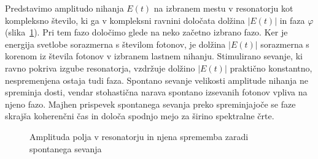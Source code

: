 Predstavimo amplitudo nihanja $E(t)$ na izbranem mestu v resonatorju kot kompleksno 
število, ki ga v kompleksni ravnini določata dolžina $|E(t)|$ in faza
$\varphi$ (slika~\ref{fig:fazor}). 
Pri tem fazo določimo glede na neko začetno izbrano fazo. 
Ker je energija svetlobe sorazmerna s številom fotonov, je dolžina $|E(t)|$
sorazmerna s korenom iz števila fotonov v izbranem lastnem nihanju. 
Stimulirano sevanje, ki ravno pokriva izgube resonatorja, vzdržuje
dolžino $|E(t)|$ praktično konstantno, nespremenjena ostaja 
tudi faza. Spontano sevanje velikosti amplitude nihanja ne spreminja dosti, 
vendar stohastična narava spontano izsevanih fotonov vpliva na njeno fazo.
Majhen prispevek spontanega sevanja preko spreminjajoče se faze
skrajša koherenčni čas in določa spodnjo mejo za širino spektralne črte. 

\begin{figure}[h]
\centering
\def\svgwidth{70truemm} 

\caption{Amplituda polja v resonatorju in njena sprememba zaradi 
spontanega sevanja}
\label{fig:fazor}
\end{figure}

